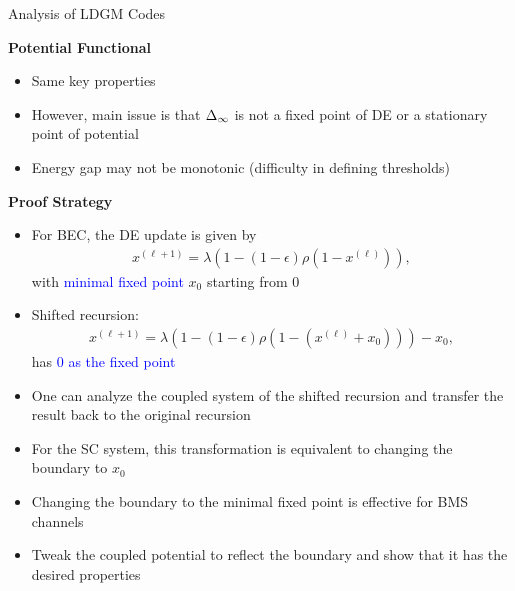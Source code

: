 \documentclass{beamer}
\newlength{\threecolwid}
\begin{document}
\begin{columns}[t]
\begin{column}{\threecolwid}
\vspace{1cm}
\begin{block}{Analysis of LDGM Codes}

\setlength\tikzheight{14.5cm}
\setlength\tikzwidth{19cm}


\textcolor{jblue}{\bf Potential Functional}

\begin{itemize}
\item Same key properties
\item However, main issue is that $\Delta_\infty$ is not a fixed point of DE or a stationary point of potential
\item Energy gap \alert{may not} be monotonic (difficulty in defining thresholds)
\end{itemize}

\textcolor{jblue}{\bf Proof Strategy}
\begin{itemize}
\item For BEC, the DE update is given by 
  \begin{align*}
    x^{(\ell+1)} = \lambda(1-(1-\epsilon) \rho(1-x^{(\ell)})),
  \end{align*}
   with \textcolor{blue}{minimal fixed point} $x_0$ starting from 0
\item \alert{Shifted recursion}:
  \begin{align*}
      x^{(\ell+1)} = \lambda(1-(1-\epsilon) \rho(1-(x^{(\ell)}+x_0))) - x_0 ,
  \end{align*}
  has \textcolor{blue}{$0$ as the fixed point}
\item One can analyze the coupled system of the shifted recursion and transfer the result back to the original recursion
\item For the SC system, this transformation is equivalent to changing the boundary to $x_0$
\item Changing the boundary to the minimal fixed point is effective for BMS channels
\item Tweak the coupled potential to reflect the boundary and show that it has the desired properties
\end{itemize}

\end{block}


\end{column}
\end{columns}
\end{document}
